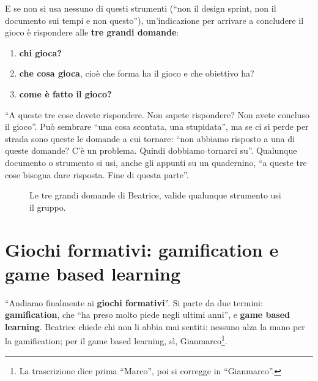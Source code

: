 E se non si usa nessuno di questi strumenti (``non il design sprint, non il documento
sui tempi e non questo''), un'indicazione per arrivare a concludere il gioco è
rispondere alle \textbf{tre grandi domande}:
\begin{enumerate}
  \item \textbf{chi gioca?}
  \item \textbf{che cosa gioca}, cioè che forma ha il gioco e che obiettivo ha?
  \item \textbf{come è fatto il gioco?}
\end{enumerate}
``A queste tre cose dovete rispondere. Non sapete rispondere? Non avete concluso il
gioco''. Può sembrare ``una cosa scontata, una stupidata'', ma se ci si perde per
strada sono queste le domande a cui tornare: ``non abbiamo risposto a una di queste
domande? C'è un problema. Quindi dobbiamo tornarci su''. Qualunque documento o
strumento si usi, anche gli appunti su un quadernino, ``a queste tre cose bisogna dare
risposta. Fine di questa parte''.

\begin{figure}[htbp]
\centering
{}
\caption{Le tre grandi domande di Beatrice, valide qualunque strumento usi il
gruppo.}
\label{a9:fig:tredomande}
\end{figure}

\section{Giochi formativi: gamification e game based learning}
\label{a9:sec:formativi}

``Andiamo finalmente ai \textbf{giochi formativi}''. Si parte da due termini:
\textbf{gamification}, che ``ha preso molto piede negli ultimi anni'', e \textbf{game
based learning}. Beatrice chiede chi non li abbia mai sentiti: nessuno alza la mano
per la gamification; per il game based learning, sì, Gianmarco\footnote{La
trascrizione dice prima ``Marco'', poi si corregge in ``Gianmarco''.}.

